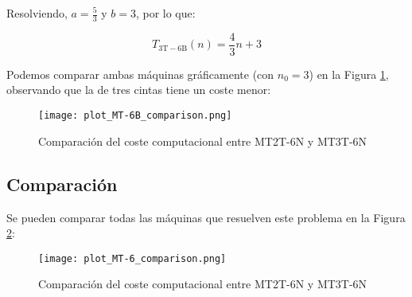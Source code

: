 Resolviendo, $a=\frac{5}{3}$ y $b=3$, por lo que:

\begin{equation}
    T_{\mathrm{3T-6B}}(n) = \frac{4}{3}n + 3
\end{equation}


Podemos comparar ambas máquinas gráficamente (con $n_0 = 3$) en la Figura \ref{fig:MT-6B}, observando que la de tres cintas tiene un coste menor:

\begin{figure}[H]
    \centering
    \texttt{[image: plot\_MT-6B\_comparison.png]}
    \caption{Comparación del coste computacional entre MT2T-6N y MT3T-6N}
    \label{fig:MT-6B}
\end{figure}


\subsection*{Comparación}
Se pueden comparar todas las máquinas que resuelven este problema en la Figura \ref{fig:MT-6}:
\begin{figure}[H]
    \centering
    \texttt{[image: plot\_MT-6\_comparison.png]}
    \caption{Comparación del coste computacional entre MT2T-6N y MT3T-6N}
    \label{fig:MT-6}
\end{figure}